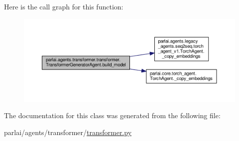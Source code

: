 Here is the call graph for this function\+:
\nopagebreak
\begin{figure}[H]
\begin{center}
\leavevmode
\includegraphics[width=350pt]{classparlai_1_1agents_1_1transformer_1_1transformer_1_1TransformerGeneratorAgent_a473f2a19d6bce412c4c9163c7beb9b09_cgraph}
\end{center}
\end{figure}


The documentation for this class was generated from the following file\+:\begin{DoxyCompactItemize}
\item 
parlai/agents/transformer/\hyperlink{transformer_8py}{transformer.\+py}\end{DoxyCompactItemize}
